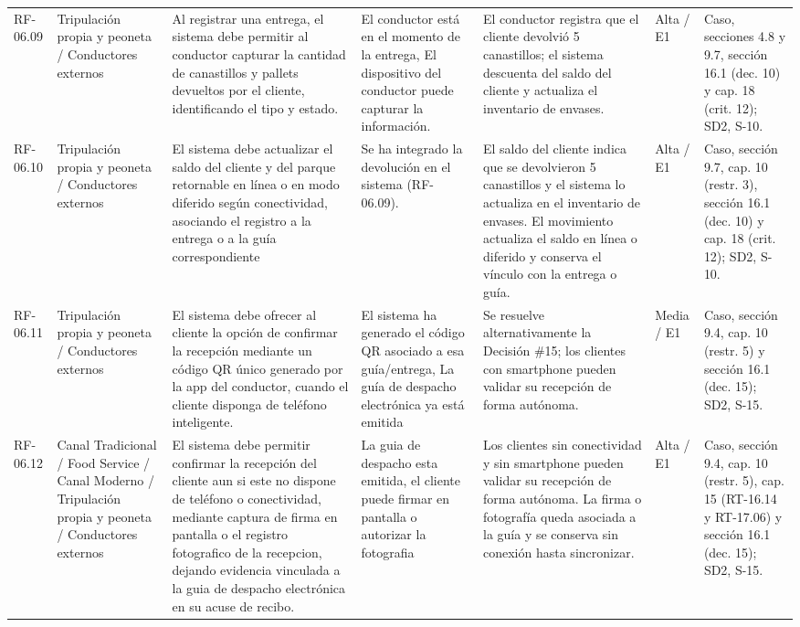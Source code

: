 {\begin{longtable}{@{}F{0.062} F{0.080} F{0.195} F{0.160} F{0.240} F{0.093} F{0.170}@{}}
  RF-06.09 & Tripulación propia y peoneta / Conductores externos & Al registrar una entrega, el sistema debe permitir al conductor capturar la cantidad de canastillos y pallets devueltos por el cliente, identificando el tipo y estado. & El conductor está en el momento de la entrega, El dispositivo del conductor puede capturar la información. & El conductor registra que el cliente devolvió 5 canastillos; el sistema descuenta del saldo del cliente y actualiza el inventario de envases. & Alta / E1 & Caso, secciones 4.8 y 9.7, sección 16.1 (dec. 10) y cap. 18 (crit. 12); SD2, S-10. \\
  RF-06.10 & Tripulación propia y peoneta / Conductores externos & El sistema debe actualizar el saldo del cliente y del parque retornable en línea o en modo diferido según conectividad, asociando el registro a la entrega o a la guía correspondiente & Se ha integrado la devolución en el sistema (RF-06.09). & El saldo del cliente indica que se devolvieron 5 canastillos y el sistema lo actualiza en el inventario de envases. El movimiento actualiza el saldo en línea o diferido y conserva el vínculo con la entrega o guía. & Alta / E1 & Caso, sección 9.7, cap. 10 (restr. 3), sección 16.1 (dec. 10) y cap. 18 (crit. 12); SD2, S-10. \\
  RF-06.11 & Tripulación propia y peoneta / Conductores externos & El sistema debe ofrecer al cliente la opción de confirmar la recepción mediante un código QR único generado por la app del conductor, cuando el cliente disponga de teléfono inteligente. & El sistema ha generado el código QR asociado a esa guía/entrega, La guía de despacho electrónica ya está emitida & Se resuelve alternativamente la Decisión \#15; los clientes con smartphone pueden validar su recepción de forma autónoma. & Media / E1 & Caso, sección 9.4, cap. 10 (restr. 5) y sección 16.1 (dec. 15); SD2, S-15. \\
  RF-06.12 & Canal Tradicional / Food Service / Canal Moderno / Tripulación propia y peoneta / Conductores externos & El sistema debe permitir confirmar la recepción del cliente aun si este no dispone de teléfono o conectividad, mediante captura de firma en pantalla o el registro fotografico de la recepcion, dejando evidencia vinculada a la guia de despacho electrónica en su acuse de recibo. & La guia de despacho esta emitida, el cliente puede firmar en pantalla o autorizar la fotografia & Los clientes sin conectividad y sin smartphone pueden validar su recepción de forma autónoma. La firma o fotografía queda asociada a la guía y se conserva sin conexión hasta sincronizar. & Alta / E1 & Caso, sección 9.4, cap. 10 (restr. 5), cap. 15 (RT-16.14 y RT-17.06) y sección 16.1 (dec. 15); SD2, S-15. \\

\end{longtable}}
